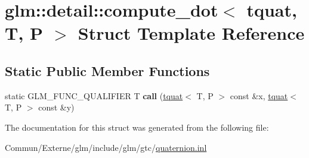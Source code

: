 \hypertarget{structglm_1_1detail_1_1compute__dot_3_01tquat_00_01_t_00_01_p_01_4}{}\section{glm\+:\+:detail\+:\+:compute\+\_\+dot$<$ tquat, T, P $>$ Struct Template Reference}
\label{structglm_1_1detail_1_1compute__dot_3_01tquat_00_01_t_00_01_p_01_4}
\subsection*{Static Public Member Functions}
\begin{DoxyCompactItemize}
\item 
static G\+L\+M\+\_\+\+F\+U\+N\+C\+\_\+\+Q\+U\+A\+L\+I\+F\+I\+ER T {\bfseries call} (\hyperlink{structglm_1_1detail_1_1tquat}{tquat}$<$ T, P $>$ const \&x, \hyperlink{structglm_1_1detail_1_1tquat}{tquat}$<$ T, P $>$ const \&y)\hypertarget{structglm_1_1detail_1_1compute__dot_3_01tquat_00_01_t_00_01_p_01_4_a4f27c293f2e5e43f23e019303336601e}{}\label{structglm_1_1detail_1_1compute__dot_3_01tquat_00_01_t_00_01_p_01_4_a4f27c293f2e5e43f23e019303336601e}

\end{DoxyCompactItemize}


The documentation for this struct was generated from the following file\+:\begin{DoxyCompactItemize}
\item 
Commun/\+Externe/glm/include/glm/gtc/\hyperlink{glm_2include_2glm_2gtc_2quaternion_8inl}{quaternion.\+inl}\end{DoxyCompactItemize}
